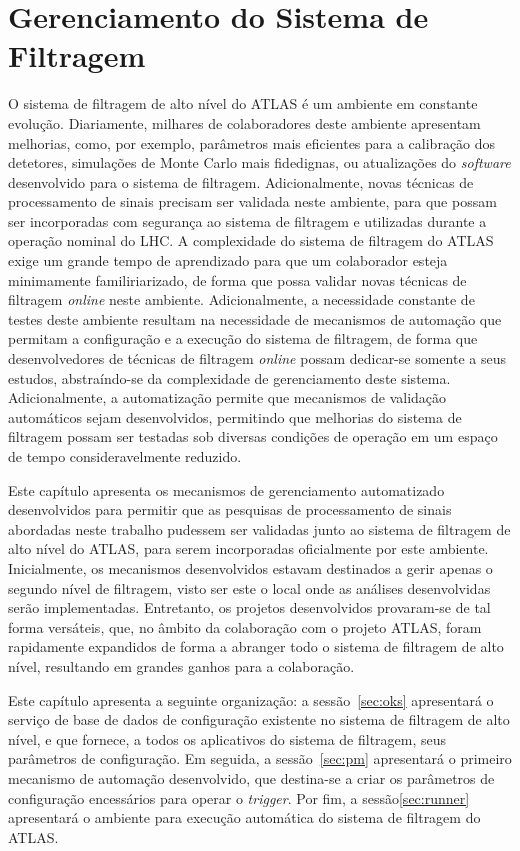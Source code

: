 \chapter{Gerenciamento do Sistema de Filtragem}
\label{chap:pm}

O sistema de filtragem de alto nível do ATLAS é um ambiente em constante evolução. Diariamente, milhares de colaboradores deste ambiente apresentam melhorias, como, por exemplo, parâmetros mais eficientes para a calibração dos detetores,  simulações de Monte Carlo mais fidedignas, ou atualizações do \emph{software} desenvolvido para o sistema de filtragem. Adicionalmente, novas técnicas de processamento de sinais precisam ser validada neste ambiente, para que possam ser incorporadas com segurança ao sistema de filtragem e utilizadas durante a operação nominal do LHC. A complexidade do sistema de filtragem do ATLAS exige um grande tempo de aprendizado para que um colaborador esteja minimamente familiriarizado, de forma que possa validar novas técnicas de filtragem \emph{online} neste ambiente. Adicionalmente, a necessidade constante de testes deste ambiente resultam na necessidade de mecanismos de automação que permitam a configuração e a execução do sistema de filtragem, de forma que desenvolvedores de técnicas de filtragem \emph{online} possam dedicar-se somente a seus estudos, abstraíndo-se da complexidade de gerenciamento deste sistema. Adicionalmente, a automatização permite que mecanismos de validação automáticos sejam desenvolvidos, permitindo que melhorias do sistema de filtragem possam ser testadas sob diversas condições de operação em um espaço de tempo consideravelmente reduzido.

Este capítulo apresenta os mecanismos de gerenciamento automatizado desenvolvidos para permitir que as pesquisas de processamento de sinais abordadas neste trabalho pudessem ser validadas junto ao sistema de filtragem de alto nível do ATLAS, para serem incorporadas oficialmente por este ambiente. Inicialmente, os mecanismos desenvolvidos estavam destinados a gerir apenas o segundo nível de filtragem, visto ser este o local onde as análises desenvolvidas serão implementadas. Entretanto, os projetos desenvolvidos provaram-se de tal forma versáteis, que, no âmbito da colaboração com o projeto ATLAS, foram rapidamente expandidos de forma a abranger todo o sistema de filtragem de alto nível, resultando em grandes ganhos para a colaboração. 

Este capítulo apresenta a seguinte organização: a sessão~\ref{sec:oks} apresentará o serviço de base de dados de configuração existente no sistema de filtragem de alto nível, e que fornece, a todos os aplicativos do sistema de filtragem, seus parâmetros de configuração. Em seguida, a sessão~\ref{sec:pm} apresentará o primeiro mecanismo de automação desenvolvido, que destina-se a criar os parâmetros de configuração encessários para operar o \emph{trigger}. Por fim, a sessão\ref{sec:runner} apresentará o ambiente para execução automática do sistema de filtragem do ATLAS.


